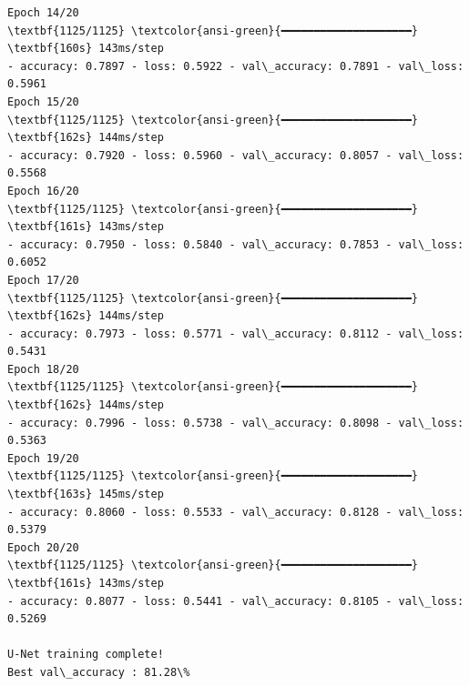 \documentclass[11pt]{article}
\begin{document}
\begin{Verbatim}[commandchars=\\\{\}]
Epoch 14/20
\textbf{1125/1125} \textcolor{ansi-green}{━━━━━━━━━━━━━━━━━━━━} \textbf{160s} 143ms/step
- accuracy: 0.7897 - loss: 0.5922 - val\_accuracy: 0.7891 - val\_loss: 0.5961
Epoch 15/20
\textbf{1125/1125} \textcolor{ansi-green}{━━━━━━━━━━━━━━━━━━━━} \textbf{162s} 144ms/step
- accuracy: 0.7920 - loss: 0.5960 - val\_accuracy: 0.8057 - val\_loss: 0.5568
Epoch 16/20
\textbf{1125/1125} \textcolor{ansi-green}{━━━━━━━━━━━━━━━━━━━━} \textbf{161s} 143ms/step
- accuracy: 0.7950 - loss: 0.5840 - val\_accuracy: 0.7853 - val\_loss: 0.6052
Epoch 17/20
\textbf{1125/1125} \textcolor{ansi-green}{━━━━━━━━━━━━━━━━━━━━} \textbf{162s} 144ms/step
- accuracy: 0.7973 - loss: 0.5771 - val\_accuracy: 0.8112 - val\_loss: 0.5431
Epoch 18/20
\textbf{1125/1125} \textcolor{ansi-green}{━━━━━━━━━━━━━━━━━━━━} \textbf{162s} 144ms/step
- accuracy: 0.7996 - loss: 0.5738 - val\_accuracy: 0.8098 - val\_loss: 0.5363
Epoch 19/20
\textbf{1125/1125} \textcolor{ansi-green}{━━━━━━━━━━━━━━━━━━━━} \textbf{163s} 145ms/step
- accuracy: 0.8060 - loss: 0.5533 - val\_accuracy: 0.8128 - val\_loss: 0.5379
Epoch 20/20
\textbf{1125/1125} \textcolor{ansi-green}{━━━━━━━━━━━━━━━━━━━━} \textbf{161s} 143ms/step
- accuracy: 0.8077 - loss: 0.5441 - val\_accuracy: 0.8105 - val\_loss: 0.5269

U-Net training complete!
Best val\_accuracy : 81.28\%
    \end{Verbatim}
\end{document}
